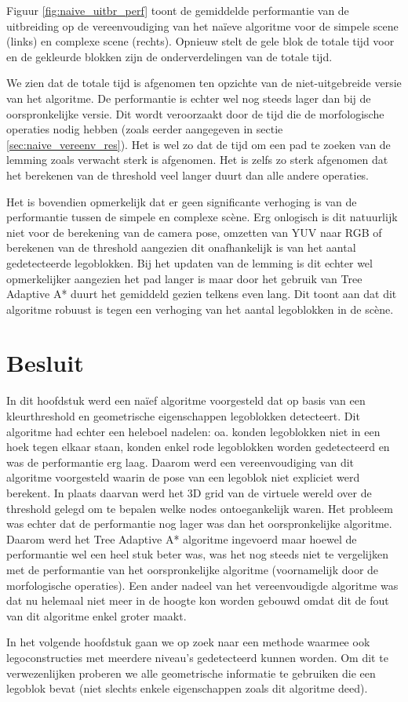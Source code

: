 Figuur \ref{fig:naive_uitbr_perf} toont de gemiddelde performantie van de uitbreiding op de vereenvoudiging van het na\"ieve algoritme voor de simpele scene (links) en complexe scene (rechts). Opnieuw stelt de gele blok de totale tijd voor en de gekleurde blokken zijn de onderverdelingen van de totale tijd.

We zien dat de totale tijd is afgenomen ten opzichte van de niet-uitgebreide versie van het algoritme. De performantie is echter wel nog steeds lager dan bij de oorspronkelijke versie. Dit wordt veroorzaakt door de tijd die de morfologische operaties nodig hebben (zoals eerder aangegeven in sectie \ref{sec:naive_vereenv_res}). Het is wel zo dat de tijd om een pad te zoeken van de lemming zoals verwacht sterk is afgenomen. Het is zelfs zo sterk afgenomen dat het berekenen van de threshold veel langer duurt dan alle andere operaties.

Het is bovendien opmerkelijk dat er geen significante verhoging is van de performantie tussen de simpele en complexe sc\`ene. Erg onlogisch is dit natuurlijk niet voor de berekening van de camera pose, omzetten van YUV naar RGB of berekenen van de threshold aangezien dit onafhankelijk is van het aantal gedetecteerde legoblokken. Bij het updaten van de lemming is dit echter wel opmerkelijker aangezien het pad langer is maar door het gebruik van Tree Adaptive A* duurt het gemiddeld gezien telkens even lang. Dit toont aan dat dit algoritme robuust is tegen een verhoging van het aantal legoblokken in de sc\`ene.

\section{Besluit} \label{sec:naive_besl}
In dit hoofdstuk werd een na\"ief algoritme voorgesteld dat op basis van een kleurthreshold en geometrische eigenschappen legoblokken detecteert. Dit algoritme had echter een heleboel nadelen: oa. konden legoblokken niet in een hoek tegen elkaar staan, konden enkel rode legoblokken worden gedetecteerd en was de performantie erg laag. Daarom werd een vereenvoudiging van dit algoritme voorgesteld waarin de pose van een legoblok niet expliciet werd berekent. In plaats daarvan werd het 3D grid van de virtuele wereld over de threshold gelegd om te bepalen welke nodes ontoegankelijk waren. Het probleem was echter dat de performantie nog lager was dan het oorspronkelijke algoritme. Daarom werd het Tree Adaptive A* algoritme ingevoerd maar hoewel de performantie wel een heel stuk beter was, was het nog steeds niet te vergelijken met de performantie van het oorspronkelijke algoritme (voornamelijk door de morfologische operaties). Een ander nadeel van het vereenvoudigde algoritme was dat nu helemaal niet meer in de hoogte kon worden gebouwd omdat dit de fout van dit algoritme enkel groter maakt.

In het volgende hoofdstuk gaan we op zoek naar een methode waarmee ook legoconstructies met meerdere niveau's gedetecteerd kunnen worden. Om dit te verwezenlijken proberen we alle geometrische informatie te gebruiken die een legoblok bevat (niet slechts enkele eigenschappen zoals dit algoritme deed). 

